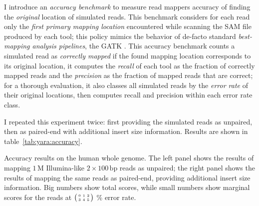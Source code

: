I introduce an \emph{accuracy benchmark} to measure read mappers accuracy of finding the \emph{original} location of simulated reads.
This benchmark considers for each read only the \emph{first primary mapping location} encountered while scanning the SAM file \citep{?} produced by each tool;
this policy mimics the behavior of de-facto standard \emph{best-mapping analysis pipelines}, \eg the GATK \citep{DePristo2011}.
This accuracy benchmark counts a simulated read as \emph{correctly mapped} if the found mapping location corresponds to its original location,
it computes the \emph{recall} of each tool as the fraction of correctly mapped reads and the \emph{precision} as the fraction of mapped reads that are correct;
for a thorough evaluation, it also classes all simulated reads by the \emph{error rate} of their original locations, then computes recall and precision within each error rate class.

I repeated this experiment twice: first providing the simulated reads as unpaired, then as paired-end with additional insert size information.
Results are shown in table~\ref{tab:yara:accuracy}.



\begin{table*}[t]
  \caption[Yara accuracy results]
  {
  \label{tab:yara:accuracy}
    Accuracy results on the human whole genome.
    The left panel shows the results of mapping $1\,\text{M}$ Illumina-like $2 \times 100\,\text{bp}$ reads as unpaired; the right panel shows the results of mapping the same reads as paired-end, providing additional insert size information.
    Big numbers show total scores, while small numbers show marginal scores for the reads at $\bigl(\begin{smallmatrix}\mbox{\tiny 0}&\mbox{\tiny 1}&\mbox{\tiny 2}\\\mbox{\tiny 3}&\mbox{\tiny 4}&\mbox{\tiny 5}\end{smallmatrix}\bigr)$ \% error rate.
    }
  \vspace{-3mm}
  \center
  \sffamily
  \resizebox{0.95\textwidth}{!}
  {
	\renewcommand{\tabcolsep}{0.8ex}
	
  }
\end{table*}


